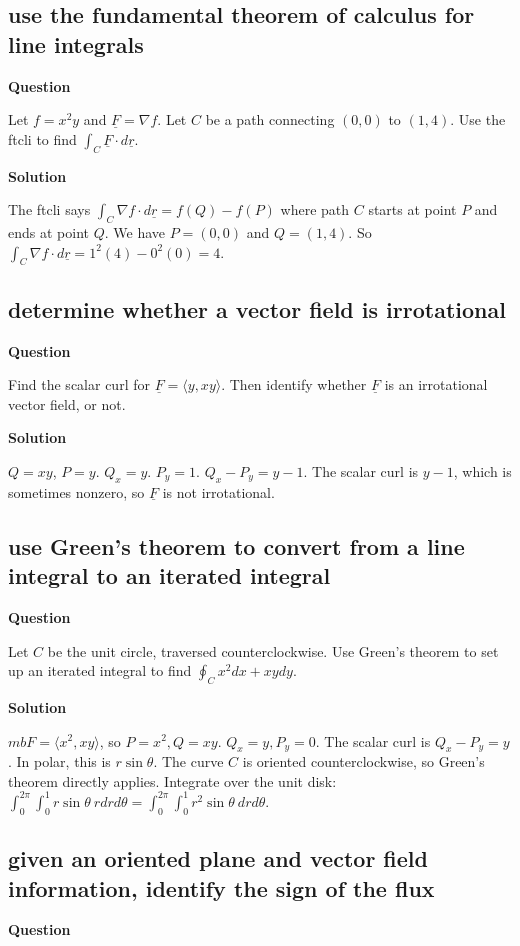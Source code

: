 \documentclass[12pt,letterpaper,noanswers]{exam}
\newcommand{\mb}[1]{\underline{#1}}
\begin{document}
\subsection{use the fundamental theorem of calculus for line integrals}
\noindent\textbf{Question}


Let $f = x^2y$ and $\mb F = \nabla f.$  Let $C$ be a path connecting $(0,0)$ to $(1,4)$.  Use the ftcli to find $\int_C \mb F \cdot d\mb r$.



\noindent\textbf{Solution}


The ftcli says $\int_C \nabla f \cdot d\mb r = f(Q) - f(P)$ where path $C$ starts at point $P$ and ends at point $Q$.  We have $P = (0,0)$ and $Q = (1,4)$.  So $\int_C \nabla f \cdot d\mb r = 1^2(4)-0^2(0) = 4$.


\subsection{determine whether a vector field is irrotational}
\noindent\textbf{Question}

Find the scalar curl for $\mb F = \langle y, xy \rangle$.  Then identify whether $\mb F$ is an irrotational vector field, or not.

\noindent\textbf{Solution}

$Q = xy$, $P = y$.  $Q_x = y$.  $P_y = 1$.  $Q_x - P_y = y-1$.
The scalar curl is $y-1$, which is sometimes nonzero, so $\mb F$ is not irrotational.  

\subsection{use Green's theorem to convert from a line integral to an iterated integral}
\noindent\textbf{Question}

Let $C$ be the unit circle, traversed counterclockwise.  Use Green's theorem to set up an iterated integral to find $\displaystyle\oint_C x^2 dx + xydy$.

\noindent\textbf{Solution}

$mb F = \langle x^2, xy\rangle$, so $P = x^2, Q = xy$.  $Q_x = y, P_y = 0$.  The scalar curl is $Q_x - P_y = y$.  In polar, this is $r\sin\theta$.  The curve $C$ is oriented counterclockwise, so Green's theorem directly applies.  Integrate over the unit disk: $\displaystyle\int_0^{2\pi}\int_0^1 r\sin\theta\ rdrd\theta = \displaystyle\int_0^{2\pi}\int_0^1 r^2\sin\theta\ drd\theta$.

\subsection{given an oriented plane and vector field information, identify the sign of the flux}
\noindent\textbf{Question}
\end{document}

